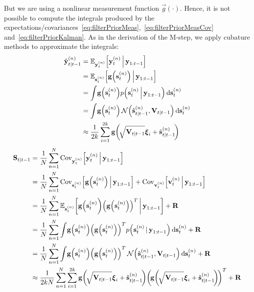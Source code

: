 		But we are using a nonlinear measurement function \( \vec{g}(\cdot) \). Hence, it is not possible to compute the integrals produced by the expectations/covariances~\eqref{eq:filterPriorMeas},~\eqref{eq:filterPriorMeasCov} and~\eqref{eq:filterPriorKalman}. As in the derivation of the M-step, we apply cubature methods to approximate the integrals:
		\begin{align}
			\hat{\boldsymbol{\mathrm{y}}}_{t \vert t - 1}^{(n)}
				&= \mathbb{E}_{\boldsymbol{\mathrm{y}}_t^{(n)}}\Big[\boldsymbol{\mathrm{y}}_t^{(n)} \,\Big\vert\, \boldsymbol{\mathrm{y}}_{1:t - 1}\Big]  \nonumber \\
				&= \mathbb{E}_{\boldsymbol{\mathrm{s}}_t^{(n)}}\Big[\boldsymbol{\mathrm{g}}\Big(\boldsymbol{\mathrm{s}}_t^{(n)}\Big) \,\Big\vert\, \boldsymbol{\mathrm{y}}_{1:t - 1}\Big]  \nonumber \\
				&= \int\! \boldsymbol{\mathrm{g}}\Big(\boldsymbol{\mathrm{s}}_t^{(n)}\Big) p\Big(\boldsymbol{\mathrm{s}}_t^{(n)} \,\Big\vert\, \boldsymbol{\mathrm{y}}_{1:t - 1}\Big) \dd{\boldsymbol{\mathrm{s}}_t^{(n)}}  \nonumber \\
				&= \int\! \boldsymbol{\mathrm{g}}\Big(\boldsymbol{\mathrm{s}}_t^{(n)}\Big) \,\mathcal{N}\Big(\hat{\boldsymbol{\mathrm{s}}}_{t \vert t - 1}^{(n)}, \boldsymbol{\mathrm{V}}_{t \vert t - 1}\Big) \dd{\boldsymbol{\mathrm{s}}_t^{(n)}}  \nonumber \\
				&\approx \frac{1}{2k} \sum_{i = 1}^{2k} \boldsymbol{\mathrm{g}}\bigg(\! \sqrt{\boldsymbol{\mathrm{V}}_{t \vert t - 1}} \boldsymbol{\mathrm{\xi}}_i + \hat{\boldsymbol{\mathrm{s}}}_{t \vert t - 1}^{(n)} \!\bigg)  \label{eq:cubatureY}
		\end{align}
		\begin{align}
			\mat{S}_{t \subgiven t - 1}
				&= \frac{1}{N} \sum_{n = 1}^{N} \Cov_{\vec{y}_t^{(n)}}\!\Big[\vec{y}_t^{(n)} \Biggiven \vec{y}_{1:t - 1}\Big]  \nonumber \\
				&= \frac{1}{N} \sum_{n = 1}^{N} \Cov_{\vec{s}_t^{(n)}}\!\Big[\vec{g}\Big(\vec{s}_t^{(n)}\Big) \Biggiven \vec{y}_{1:t - 1}\Big] + \Cov_{\vec{v}_t^{(n)}}\!\Big[\vec{v}_t^{(n)} \Biggiven \vec{y}_{1:t - 1}\Big]  \nonumber \\
				&= \frac{1}{N} \sum_{n = 1}^{N} \E_{\vec{s}_t^{(n)}}\bigg[\vec{g}\Big(\vec{s}_t^{(n)}\bigg) \Big(\vec{g}\Big(\vec{s}_t^{(n)}\Big)\Big)^T \bigggiven \vec{y}_{1:t - 1}\bigg] + \mat{R}  \nonumber \\
				&= \frac{1}{N} \sum_{n = 1}^{N} \int\! \vec{g}\Big(\vec{s}_t^{(n)}\Big) \Big(\vec{g}\Big(\vec{s}_t^{(n)}\Big)\Big)^T p\Big(\vec{s}_t^{(n)} \given \vec{y}_{1:t - 1}\Big) \dd{\vec{s}_t^{(n)}} + \mat{R}  \nonumber \\
				&= \frac{1}{N} \sum_{n = 1}^{N} \int\! \vec{g}\Big(\vec{s}_t^{(n)}\Big) \Big(\vec{g}\Big(\vec{s}_t^{(n)}\Big)\Big)^T \,\normal\Big(\hat{\vec{s}}_{t \subgiven t - 1}^{(n)}, \mat{V}_{t \subgiven t - 1}\Big) \dd{\vec{s}_t^{(n)}} + \mat{R}  \nonumber \\
				&\approx \frac{1}{2kN} \sum_{n = 1}^{N} \sum_{i = 1}^{2k} \vec{g}\bigg(\!\sqrt{\mat{V}_{t \subgiven t - 1}} \vec{\xi}_i + \hat{\vec{s}}_{t \subgiven t - 1}^{(n)}\!\bigg) \bigg(\!\vec{g}\bigg(\!\sqrt{\mat{V}_{t \subgiven t - 1}} \vec{\xi}_i + \hat{\vec{s}}_{t \subgiven t - 1}^{(n)}\!\bigg)\!\bigg)^T + \mat{R}  \label{eq:cubatureS}
		\end{align}
